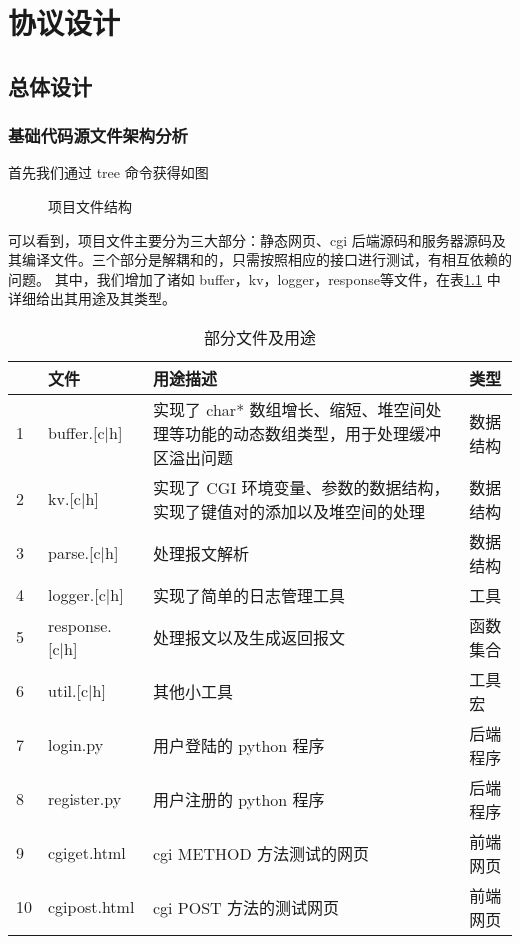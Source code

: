 

\chapter{协议设计}

\section{总体设计}

\subsection{基础代码源文件架构分析}
首先我们通过 tree 命令获得如图

\begin{figure}[htbp!]
  \centering
  \caption{项目文件结构}\label{fig:structure}
\end{figure}

可以看到，项目文件主要分为三大部分：静态网页、cgi 后端源码和服务器源码及其编译文件。三个部分是解耦和的，只需按照相应的接口进行测试，有相互依赖的问题。
其中，我们增加了诸如 buffer，kv，logger，response等文件，在表\ref{tab:structure} 中详细给出其用途及其类型。

\begin{table}[htbp!]
  \centering
  \begin{tabular}{p{5pt}p{65pt}p{220pt}p{60pt}}
  \hline
    & 文件                 & 用途描述         & 类型 \\ \hline
  1 & buffer.{[}c|h{]}   & 实现了 char* 数组增长、缩短、堆空间处理等功能的动态数组类型，用于处理缓冲区溢出问题 & 数据结构 \\
  2 & kv.{[}c|h{]}       & 实现了 CGI 环境变量、参数的数据结构，实现了键值对的添加以及堆空间的处理        & 数据结构\\
  3 & parse.{[}c|h{]}    & 处理报文解析   & 数据结构 \\
  4 & logger.{[}c|h{]}   & 实现了简单的日志管理工具 & 工具\\
  5 & response.{[}c|h{]} & 处理报文以及生成返回报文 & 函数集合 \\
  6 & util.{[}c|h{]}     & 其他小工具  & 工具宏 \\
  7 & login.py          & 用户登陆的 python 程序 & 后端程序\\
  8 & register.py       & 用户注册的 python 程序 & 后端程序\\
  9 & cgiget.html       & cgi METHOD 方法测试的网页 & 前端网页\\
  10 & cgipost.html     & cgi POST 方法的测试网页 & 前端网页\\
  \hline
  \end{tabular}
  \caption{部分文件及用途}\label{tab:structure}
  \end{table}

